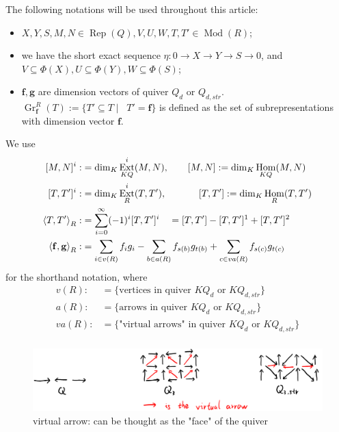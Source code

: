 \documentclass[reqno,11pt]{amsart}
\numberwithin{equation}{section}
\theoremstyle{plain}
\theoremstyle{plain}
\numberwithin{equation}{section}
\theoremstyle{remark}
\DeclareMathOperator{\Rep}{\operatorname{Rep}}
\DeclareMathOperator{\Mod}{\operatorname{Mod}}
\DeclareMathOperator{\Hom}{\operatorname{Hom}}
\DeclareMathOperator{\Ext}{\operatorname{Ext}}
\DeclareMathOperator{\dimv}{\operatorname{\underline{\mathbf{dim}}}}
\newcommand{\Grr}{\operatorname{Gr}^{R}}
\newcommand{\dimvec}[1]{\mathbf{#1}}
\begin{document}
   The following notations will be used throughout this article:
   \begin{itemize}
   		\item $X,Y,S,M,N \in \Rep(Q), V,U,W,T,T' \in \Mod(R)$;
   		\item we have the short exact sequence $\eta:0\longrightarrow X \longrightarrow Y \longrightarrow S \longrightarrow 0$, and $V \subseteq \Phi(X), U \subseteq \Phi(Y), W \subseteq \Phi(S)$;
   		\item $\dimvec{f},\dimvec{g}$ are dimension vectors of quiver $Q_d$ or $Q_{d,str}$. $\Grr_{\dimvec{f}}(T):= \{ T' \subseteq T \mid \dimv T'=\dimvec{f} \}$ is defined as the set of subrepresentations with dimension vector $\dimvec{f}$.
   \end{itemize}
We use 
\begin{equation*}
\begin{aligned}[]
	[M,N]^i:&=\dim_K \Ext^i_{KQ} (M,N),\qquad [M,N]:=\dim_K \Hom_{KQ} (M,N)\\
	[T,T']^i:&=\dim_K \Ext^i_R (T,T'),\qquad\hspace{0.5cm} [T,T']:=\dim_K \Hom_R (T,T')\\
	\left< T,T'\right>_R:&= \sum_{i=0}^{\infty} (-1)^i [T,T']^i \quad=[T,T']-[T,T']^1+[T,T']^2\\
	\left< \dimvec{f},\dimvec{g}\right>_R:&= \sum_{i \in v(R)} f_ig_i - \sum_{b \in a(R)} f_{s(b)}g_{t(b)}+ \sum_{c \in va(R)} f_{s(c)}g_{t(c)}
\end{aligned}
\end{equation*}
for the shorthand notation, where
\begin{equation*}
\begin{aligned}
	v(R):&= \{\text{vertices in quiver $KQ_d$ or $KQ_{d,str}$}\} \\
	a(R):&= \{\text{arrows in quiver $KQ_d$ or $KQ_{d,str}$}\} \\
	va(R):&= \{\text{"virtual arrows" in quiver $KQ_d$ or $KQ_{d,str}$}\} \\
\end{aligned}
\end{equation*}

\begin{center}
	\begin{figure}[ht]
		\vspace{0cm}
		\centering
		\includegraphics[width=15cm]{figures/virtualarrow.png}
		\caption{virtual arrow: can be thought as the "face" of the quiver}
		\label{fig:virtualarrow}
	\end{figure}
\end{center}
\end{document}
